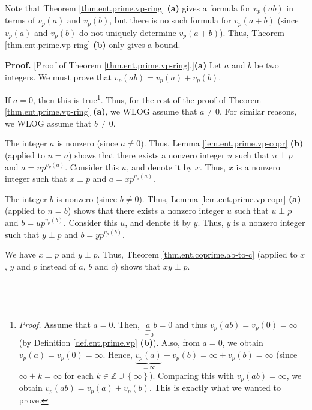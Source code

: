 \documentclass[numbers=enddot,12pt,final,onecolumn,notitlepage]{scrartcl}%
\numberwithin{exer}{subsection}
\theoremstyle{definition}
\newenvironment{proof}[1][Proof]{\noindent\textbf{#1.} }{\ \rule{0.5em}{0.5em}}
\begin{document}
Note that Theorem \ref{thm.ent.prime.vp-ring} \textbf{(a)} gives a formula for
$v_{p}\left(  ab\right)  $ in terms of $v_{p}\left(  a\right)  $ and
$v_{p}\left(  b\right)  $, but there is no such formula for $v_{p}\left(
a+b\right)  $ (since $v_{p}\left(  a\right)  $ and $v_{p}\left(  b\right)  $
do not uniquely determine $v_{p}\left(  a+b\right)  $). Thus, Theorem
\ref{thm.ent.prime.vp-ring} \textbf{(b)} only gives a bound.

\begin{proof}
[Proof of Theorem \ref{thm.ent.prime.vp-ring}.]\textbf{(a)} Let $a$ and $b$ be
two integers. We must prove that $v_{p}\left(  ab\right)  =v_{p}\left(
a\right)  +v_{p}\left(  b\right)  $.

If $a=0$, then this is true\footnote{\textit{Proof.} Assume that $a=0$. Then,
$\underbrace{a}_{=0}b=0$ and thus $v_{p}\left(  ab\right)  =v_{p}\left(
0\right)  =\infty$ (by Definition \ref{def.ent.prime.vp} \textbf{(b)}). Also,
from $a=0$, we obtain $v_{p}\left(  a\right)  =v_{p}\left(  0\right)  =\infty
$. Hence, $\underbrace{v_{p}\left(  a\right)  }_{=\infty}+v_{p}\left(
b\right)  =\infty+v_{p}\left(  b\right)  =\infty$ (since $\infty+k=\infty$ for
each $k\in\mathbb{Z}\cup\left\{  \infty\right\}  $). Comparing this with
$v_{p}\left(  ab\right)  =\infty$, we obtain $v_{p}\left(  ab\right)
=v_{p}\left(  a\right)  +v_{p}\left(  b\right)  $. This is exactly what we
wanted to prove.}. Thus, for the rest of the proof of Theorem
\ref{thm.ent.prime.vp-ring} \textbf{(a)}, we WLOG assume that $a\neq0$. For
similar reasons, we WLOG assume that $b\neq0$.

The integer $a$ is nonzero (since $a\neq0$). Thus, Lemma
\ref{lem.ent.prime.vp-copr} \textbf{(b)} (applied to $n=a$) shows that there
exists a nonzero integer $u$ such that $u\perp p$ and $a=up^{v_{p}\left(
a\right)  }$. Consider this $u$, and denote it by $x$. Thus, $x$ is a nonzero
integer such that $x\perp p$ and $a=xp^{v_{p}\left(  a\right)  }$.

The integer $b$ is nonzero (since $b\neq0$). Thus, Lemma
\ref{lem.ent.prime.vp-copr} \textbf{(a)} (applied to $n=b$) shows that there
exists a nonzero integer $u$ such that $u\perp p$ and $b=up^{v_{p}\left(
b\right)  }$. Consider this $u$, and denote it by $y$. Thus, $y$ is a nonzero
integer such that $y\perp p$ and $b=yp^{v_{p}\left(  b\right)  }$.

We have $x\perp p$ and $y\perp p$. Thus, Theorem \ref{thm.ent.coprime.ab-to-c}
(applied to $x$, $y$ and $p$ instead of $a$, $b$ and $c$) shows that $xy\perp
p$.


\end{proof}
\end{document}
